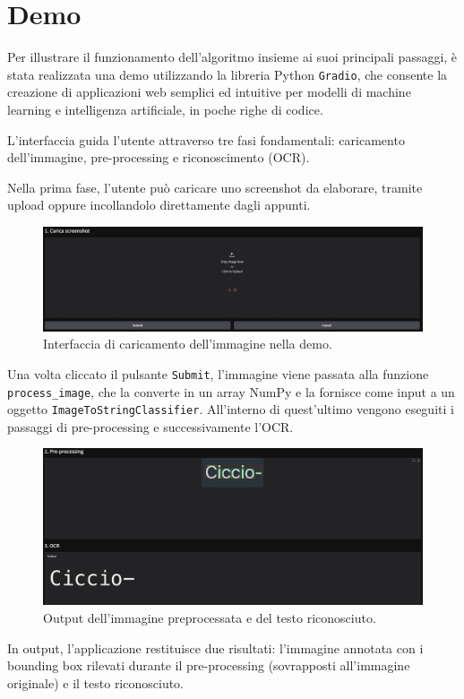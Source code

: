 \chapter{Demo}
Per illustrare il funzionamento dell'algoritmo insieme ai suoi principali passaggi, è stata realizzata una demo utilizzando la libreria Python \texttt{Gradio}, che consente la creazione di applicazioni web semplici ed intuitive per modelli di machine learning e intelligenza artificiale, in poche righe di codice.

L'interfaccia guida l'utente attraverso tre fasi fondamentali: caricamento dell'immagine, pre-processing e riconoscimento (OCR).

Nella prima fase, l’utente può caricare uno screenshot da elaborare, tramite upload oppure incollandolo direttamente dagli appunti.
\begin{figure}[H]
    \centering
    \includegraphics[width=1\textwidth]{images/demo-1fase.png}
    \caption{Interfaccia di caricamento dell'immagine nella demo.}
    \label{fig:demo-carica}
\end{figure}

Una volta cliccato il pulsante \texttt{Submit}, l’immagine viene passata alla funzione \texttt{process\_image}, che la converte in un array NumPy e la fornisce come input a un oggetto \texttt{ImageToStringClassifier}. All'interno di quest'ultimo vengono eseguiti i passaggi di pre-processing e successivamente l'OCR.
\begin{figure}[H]
    \centering
    \includegraphics[width=1\textwidth]{images/demo-23fase.png}
    \caption{Output dell'immagine preprocessata e del testo riconosciuto.}
    \label{fig:demo-carica}
\end{figure}

In output, l'applicazione restituisce due risultati: l'immagine annotata con i bounding box rilevati durante il pre-processing (sovrapposti all'immagine originale) e il testo riconosciuto.
